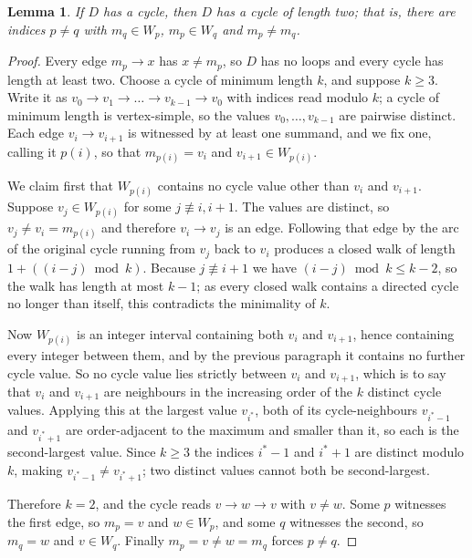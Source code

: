 \documentclass[11pt, a4paper, abstract=yes]{scrartcl}
\theoremstyle{definition}
\theoremstyle{remark}
\theoremstyle{plain}
\newtheorem{lemma}[definition]{Lemma}
\begin{document}
\begin{lemma}
If \(D\) has a cycle, then \(D\) has a cycle of length two; that is, there are indices \(p\ne q\)
with \(m_q\in W_p\), \(m_p\in W_q\) and \(m_p\ne m_q\).
\label{org0e7b129}
\end{lemma}

\begin{proof}
Every edge \(m_p\to x\) has \(x\ne m_p\), so \(D\) has no loops and every cycle has length at least
two. Choose a cycle of minimum length \(k\), and suppose \(k\ge3\). Write it as
\(v_0\to v_1\to\dots\to v_{k-1}\to v_0\) with indices read modulo \(k\); a cycle of minimum length
is vertex-simple, so the values \(v_0,\dots,v_{k-1}\) are pairwise distinct. Each edge
\(v_i\to v_{i+1}\) is witnessed by at least one summand, and we fix one, calling it \(p(i)\), so
that \(m_{p(i)}=v_i\) and \(v_{i+1}\in W_{p(i)}\).

We claim first that \(W_{p(i)}\) contains no cycle value other than \(v_i\) and \(v_{i+1}\). Suppose
\(v_j\in W_{p(i)}\) for some \(j\not\equiv i,i+1\). The values are distinct, so
\(v_j\ne v_i=m_{p(i)}\) and therefore \(v_i\to v_j\) is an edge. Following that edge by the arc of
the original cycle running from \(v_j\) back to \(v_i\) produces a closed walk of length
\(1+((i-j)\bmod k)\). Because \(j\not\equiv i+1\) we have \((i-j)\bmod k\le k-2\), so the walk has
length at most \(k-1\); as every closed walk contains a directed cycle no longer than itself, this
contradicts the minimality of \(k\).

Now \(W_{p(i)}\) is an integer interval containing both \(v_i\) and \(v_{i+1}\), hence containing
every integer between them, and by the previous paragraph it contains no further cycle value. So no
cycle value lies strictly between \(v_i\) and \(v_{i+1}\), which is to say that \(v_i\) and
\(v_{i+1}\) are neighbours in the increasing order of the \(k\) distinct cycle values. Applying this
at the largest value \(v_{i^\ast}\), both of its cycle-neighbours \(v_{i^\ast-1}\) and
\(v_{i^\ast+1}\) are order-adjacent to the maximum and smaller than it, so each is the
second-largest value. Since \(k\ge3\) the indices \(i^\ast-1\) and \(i^\ast+1\) are distinct modulo
\(k\), making \(v_{i^\ast-1}\ne v_{i^\ast+1}\); two distinct values cannot both be second-largest.

Therefore \(k=2\), and the cycle reads \(v\to w\to v\) with \(v\ne w\). Some \(p\) witnesses the
first edge, so \(m_p=v\) and \(w\in W_p\), and some \(q\) witnesses the second, so \(m_q=w\) and
\(v\in W_q\). Finally \(m_p=v\ne w=m_q\) forces \(p\ne q\).
\end{proof}
\end{document}
